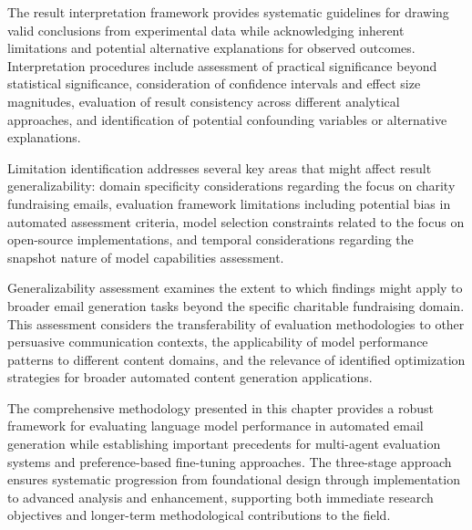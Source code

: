 The result interpretation framework provides systematic guidelines for drawing valid conclusions from experimental data while acknowledging inherent limitations and potential alternative explanations for observed outcomes. Interpretation procedures include assessment of practical significance beyond statistical significance, consideration of confidence intervals and effect size magnitudes, evaluation of result consistency across different analytical approaches, and identification of potential confounding variables or alternative explanations.

Limitation identification addresses several key areas that might affect result generalizability: domain specificity considerations regarding the focus on charity fundraising emails, evaluation framework limitations including potential bias in automated assessment criteria, model selection constraints related to the focus on open-source implementations, and temporal considerations regarding the snapshot nature of model capabilities assessment.

Generalizability assessment examines the extent to which findings might apply to broader email generation tasks beyond the specific charitable fundraising domain. This assessment considers the transferability of evaluation methodologies to other persuasive communication contexts, the applicability of model performance patterns to different content domains, and the relevance of identified optimization strategies for broader automated content generation applications.


The comprehensive methodology presented in this chapter provides a robust framework for evaluating language model performance in automated email generation while establishing important precedents for multi-agent evaluation systems and preference-based fine-tuning approaches. The three-stage approach ensures systematic progression from foundational design through implementation to advanced analysis and enhancement, supporting both immediate research objectives and longer-term methodological contributions to the field.